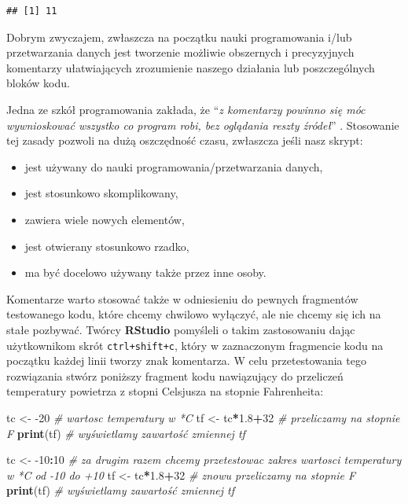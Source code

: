 \documentclass[]{book}
\newenvironment{Shaded}{\begin{snugshade}}{\end{snugshade}}
\newcommand{\KeywordTok}[1]{\textcolor[rgb]{0.13,0.29,0.53}{\textbf{#1}}}
\newcommand{\DecValTok}[1]{\textcolor[rgb]{0.00,0.00,0.81}{#1}}
\newcommand{\FloatTok}[1]{\textcolor[rgb]{0.00,0.00,0.81}{#1}}
\newcommand{\StringTok}[1]{\textcolor[rgb]{0.31,0.60,0.02}{#1}}
\newcommand{\CommentTok}[1]{\textcolor[rgb]{0.56,0.35,0.01}{\textit{#1}}}
\newcommand{\OperatorTok}[1]{\textcolor[rgb]{0.81,0.36,0.00}{\textbf{#1}}}
\newcommand{\NormalTok}[1]{#1}
\providecommand{\tightlist}{%
  \setlength{\itemsep}{0pt}\setlength{\parskip}{0pt}}
\theoremstyle{definition}
\theoremstyle{definition}
\theoremstyle{definition}
\theoremstyle{remark}
\begin{document}
\begin{verbatim}
## [1] 11
\end{verbatim}

Dobrym zwyczajem, zwłaszcza na początku nauki programowania i/lub
przetwarzania danych jest tworzenie możliwie obszernych i precyzyjnych
komentarzy ułatwiających zrozumienie naszego działania lub
poszczególnych bloków kodu.

Jedna ze szkół programowania zakłada, że ``\emph{z komentarzy powinno
się móc wywnioskować wszystko co program robi, bez oglądania reszty
źródeł}'' \citep{dewhurst1995}. Stosowanie tej zasady pozwoli na dużą
oszczędność czasu, zwłaszcza jeśli nasz skrypt:

\begin{itemize}
\tightlist
\item
  jest używany do nauki programowania/przetwarzania danych,
\item
  jest stosunkowo skomplikowany,
\item
  zawiera wiele nowych elementów,
\item
  jest otwierany stosunkowo rzadko,
\item
  ma być docelowo używany także przez inne osoby.
\end{itemize}

Komentarze warto stosować także w odniesieniu do pewnych fragmentów
testowanego kodu, które chcemy chwilowo wyłączyć, ale nie chcemy się ich
na stałe pozbywać. Twórcy \textbf{RStudio} pomyśleli o takim
zastosowaniu dając użytkownikom skrót \texttt{ctrl+shift+c}, który w
zaznaczonym fragmencie kodu na początku każdej linii tworzy znak
komentarza. W celu przetestowania tego rozwiązania stwórz poniższy
fragment kodu nawiązujący do przeliczeń temperatury powietrza z stopni
Celsjusza na stopnie Fahrenheita:

\begin{Shaded}
\begin{Highlighting}[]
\NormalTok{tc <-}\StringTok{ }\DecValTok{-20} \CommentTok{# wartosc temperatury w *C }
\NormalTok{tf <-}\StringTok{ }\NormalTok{tc}\OperatorTok{*}\FloatTok{1.8}\OperatorTok{+}\DecValTok{32} \CommentTok{# przeliczamy na stopnie F}
\KeywordTok{print}\NormalTok{(tf) }\CommentTok{# wyświetlamy zawartość zmiennej tf}

\NormalTok{tc <-}\StringTok{ }\DecValTok{-10}\OperatorTok{:}\DecValTok{10} \CommentTok{# za drugim razem chcemy przetestowac zakres wartosci temperatury w *C od -10 do +10}
\NormalTok{tf <-}\StringTok{ }\NormalTok{tc}\OperatorTok{*}\FloatTok{1.8}\OperatorTok{+}\DecValTok{32} \CommentTok{# znowu przeliczamy na stopnie F}
\KeywordTok{print}\NormalTok{(tf) }\CommentTok{# wyświetlamy zawartość zmiennej tf}
\end{Highlighting}
\end{Shaded}
\end{document}
